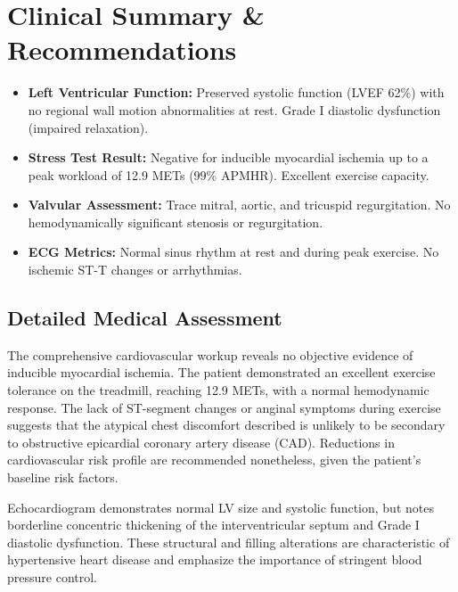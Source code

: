 \section{Clinical Summary \& Recommendations}

\begin{tcolorbox}[cardiologybox, title=Key Diagnostic Findings]
    \begin{itemize}[leftmargin=*, noitemsep]
        \item \textbf{Left Ventricular Function:} Preserved systolic function (LVEF 62\%) with no regional wall motion abnormalities at rest. Grade I diastolic dysfunction (impaired relaxation).
        \item \textbf{Stress Test Result:} Negative for inducible myocardial ischemia up to a peak workload of 12.9 METs (99\% APMHR). Excellent exercise capacity.
        \item \textbf{Valvular Assessment:} Trace mitral, aortic, and tricuspid regurgitation. No hemodynamically significant stenosis or regurgitation.
        \item \textbf{ECG Metrics:} Normal sinus rhythm at rest and during peak exercise. No ischemic ST-T changes or arrhythmias.
    \end{itemize}
\end{tcolorbox}

\subsection{Detailed Medical Assessment}
The comprehensive cardiovascular workup reveals no objective evidence of inducible myocardial ischemia. The patient demonstrated an excellent exercise tolerance on the treadmill, reaching 12.9 METs, with a normal hemodynamic response. The lack of ST-segment changes or anginal symptoms during exercise suggests that the atypical chest discomfort described is unlikely to be secondary to obstructive epicardial coronary artery disease (CAD). Reductions in cardiovascular risk profile are recommended nonetheless, given the patient's baseline risk factors.

Echocardiogram demonstrates normal LV size and systolic function, but notes borderline concentric thickening of the interventricular septum and Grade I diastolic dysfunction. These structural and filling alterations are characteristic of hypertensive heart disease and emphasize the importance of stringent blood pressure control.

